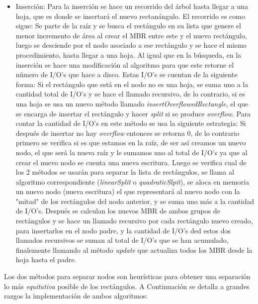 \documentclass[letterpaper,12pt]{article}
\begin{document}
\begin{itemize}
\item Inserci\'on: Para la inserci\'on se hace un recorrido del \'arbol hasta llegar a una hoja, que es donde se insertar\'a el nuevo rectan\'angulo. El recorrido es como sigue: Se parte de la ra\'iz y se busca el rect\'angulo en su lista que genere el menor incremento de \'area al crear el MBR entre este y el nuevo rect\'angulo, luego se desciende por el nodo asociado a ese rect\'angulo y se hace el mismo procedimiento, hasta llegar a una hoja. Al igual que en la b\'usqueda, en la inserci\'on se hace una modificaci\'on al algoritmo para que este retorne el n\'umero de I/O's que hace a disco. Estas I/O's se cuentan de la siguiente forma: Si el rect\'angulo que est\'a en el nodo no es una hoja, se suma uno a la cantidad total de I/O's y se hace el llamado recursivo, de lo contrario, si es una hoja se usa un nuevo m\'etodo llamado \textit{insertOverflowedRectangle}, el que se encarga de insertar el rect\'angulo y hacer \textit{split} si se produce \textit{overflow}. Para contar la cantidad de I/O's en este m\'etodo se usa la siguiente estrategia: Si despu\'es de insertar no hay \textit{overflow} entonces se retorna 0, de lo contrario primero se verifica si es que estamos en la ra\'iz, de ser as\'i creamos un nuevo nodo, el que ser\'a la nueva ra\'iz y le sumamos uno al total de I/O's ya que al crear el nuevo nodo se cuenta una nueva escritura. Luego se verifica cual de los 2 m\'etodos se usar\'an para separar la lista de rect\'angulos, se llama al algoritmo correspondiente (\textit{linearSplit} o \textit{quadraticSlpit}), se aloca en memoria un nuevo nodo (nueva escritura) el que representar\'a al nuevo nodo con la "mitad" de los rect\'angulos del nodo anterior, y se suma uno m\'as a la cantidad de I/O's. Despu\'es se calculan los nuevos MBR de ambos grupos de rect\'angulos y se hace un llamado recursivo por cada rect\'angulo nuevo creado, para insertarlos en el nodo padre, y la cantidad de I/O's ded estos dos llamados recursivos se suman al total de I/O's que se han acumulado, finalemente llamando al m\'etodo \textit{update} que actualiza todos los MBR desde la hoja hasta el padre.
\end{itemize}
Los dos m\'etodos para separar nodos son heur\'isticas para obtener una separaci\'on lo m\'as \textit{equitativa} posible de los rect\'angulos. A Continuaci\'on se detalla a grandes razgos la implementaci\'on de ambos algoritmos:
\end{document}
